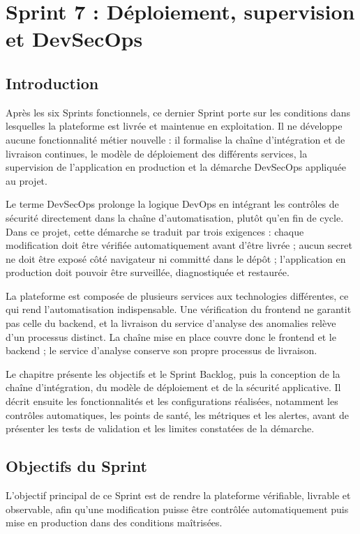 \section{Sprint 7 : Déploiement, supervision et DevSecOps}

\subsection{Introduction}

Après les six Sprints fonctionnels, ce dernier Sprint porte sur les conditions dans lesquelles la plateforme est livrée et maintenue en exploitation. Il ne développe aucune fonctionnalité métier nouvelle : il formalise la chaîne d'intégration et de livraison continues, le modèle de déploiement des différents services, la supervision de l'application en production et la démarche DevSecOps appliquée au projet.

Le terme DevSecOps prolonge la logique DevOps en intégrant les contrôles de sécurité directement dans la chaîne d'automatisation, plutôt qu'en fin de cycle. Dans ce projet, cette démarche se traduit par trois exigences : chaque modification doit être vérifiée automatiquement avant d'être livrée ; aucun secret ne doit être exposé côté navigateur ni committé dans le dépôt ; l'application en production doit pouvoir être surveillée, diagnostiquée et restaurée.

La plateforme est composée de plusieurs services aux technologies différentes, ce qui rend l'automatisation indispensable. Une vérification du frontend ne garantit pas celle du backend, et la livraison du service d'analyse des anomalies relève d'un processus distinct. La chaîne mise en place couvre donc le frontend et le backend ; le service d'analyse conserve son propre processus de livraison.

Le chapitre présente les objectifs et le Sprint Backlog, puis la conception de la chaîne d'intégration, du modèle de déploiement et de la sécurité applicative. Il décrit ensuite les fonctionnalités et les configurations réalisées, notamment les contrôles automatiques, les points de santé, les métriques et les alertes, avant de présenter les tests de validation et les limites constatées de la démarche.

\subsection{Objectifs du Sprint}

L'objectif principal de ce Sprint est de rendre la plateforme vérifiable, livrable et observable, afin qu'une modification puisse être contrôlée automatiquement puis mise en production dans des conditions maîtrisées.

